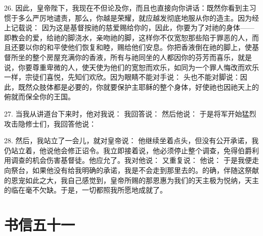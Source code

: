26. 因此，皇帝陛下，我现在不但论及你，而且也直接向你讲话：既然你看到主习惯于多么严厉地谴责，那么，你越是荣耀，就应越发彻底地服从你的造主。因为经上记载说： 因为这是基督按祂的慈爱赐给你的，因此，你要为了对祂的身体——即教会的爱，给祂的脚浇水，亲吻祂的脚，这样你不仅宽恕那些陷于罪恶的人，而且还要以你的和平使他们恢复和睦，赐给他们安息。你把香液倒在祂的脚上，使基督所坐的整个房屋充满你的香液，所有与祂同坐的人都因你的芬芳而喜乐，就是说，你要尊重卑微的人，使天使为他们的宽恕而欢乐，如同为一个罪人悔改而欢乐一样，宗徒们喜悦，先知们欢欣。因为眼睛不能对手说： 头也不能对脚说：因此，既然众肢体都是必要的，你就要保护主耶稣的整个身体，好使祂也因祂天上的俯就而保全你的王国。\par

27. 当我从讲道台下来时，他对我说： 我回答说： 然后他说： 于是将军开始猛烈攻击隐修士们，我回答他说：\par

28. 然后，我站立了一会儿，就对皇帝说： 他继续坐着点头，但没有公开承诺，我仍站立着，他说他会修正诏令。我立即接着说，他必须停止整个调查，免得伯爵利用调查的机会伤害基督徒。他应允了。我对他说： 又重复说： 他说： 于是我便走向祭台，如果他没有给我明确的承诺，我是不会走到那里去的。的确，伴随这祭献的恩宠如此之大，我自己感觉到，皇帝所赐的那恩惠为我们的天主极为悦纳，天主的临在毫不欠缺。于是，一切都照我所愿地成就了。\par



\section{书信五十一}

